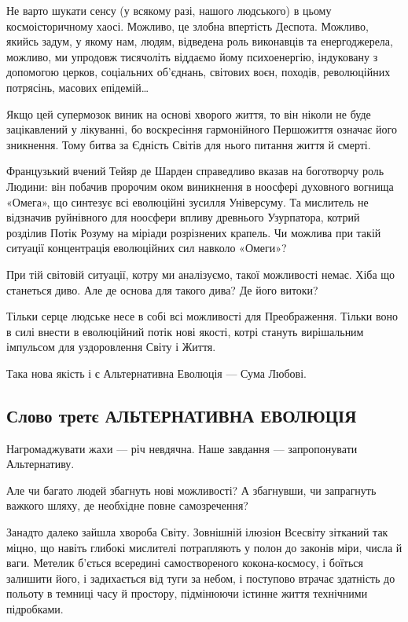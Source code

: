 Не варто шукати сенсу (у всякому разі, нашого людського) в цьому
космоісторичному хаосі. Можливо, це злобна впертість Деспота. Можливо, якийсь
задум, у якому нам, людям, відведена роль виконавців та енергоджерела, можливо,
ми упродовж тисячоліть віддаємо йому психоенергію, індуковану з допомогою
церков, соціальних об’єднань, світових воєн, походів, революційних потрясінь,
масових епідемій…

Якщо цей супермозок виник на основі хворого життя, то він ніколи не буде
зацікавлений у лікуванні, бо воскресіння гармонійного Першожиття означає його
зникнення. Тому битва за Єдність Світів для нього питання життя й смерті.

Французький вчений Тейяр де Шарден справедливо вказав на боготворчу роль
Людини: він побачив пророчим оком виникнення в ноосфері духовного вогнища
«Омега», що синтезує всі еволюційні зусилля Універсуму. Та мислитель не
відзначив руйнівного для ноосфери впливу древнього Узурпатора, котрий розділив
Потік Розуму на міріади розрізнених крапель. Чи можлива при такій ситуації
концентрація еволюційних сил навколо «Омеги»?

При тій світовій ситуації, котру ми аналізуємо, такої можливості немає. Хіба що
станеться диво. Але де основа для такого дива? Де його витоки?

Тільки серце людське несе в собі всі можливості для Преображення. Тільки воно в
силі внести в еволюційний потік нові якості, котрі стануть вирішальним
імпульсом для уздоровлення Світу і Життя.

Така нова якість і є Альтернативна Еволюція — Сума Любові.

\subsection{Слово третє АЛЬТЕРНАТИВНА ЕВОЛЮЦІЯ}

Нагромаджувати жахи — річ невдячна. Наше завдання — запропонувати Альтернативу.

Але чи багато людей збагнуть нові можливості? А збагнувши, чи запрагнуть
важкого шляху, де необхідне повне самозречення?

Занадто далеко зайшла хвороба Світу. Зовнішній ілюзіон Всесвіту зітканий так
міцно, що навіть глибокі мислителі потрапляють у полон до законів міри, числа й
ваги. Метелик б’ється всередині самоствореного кокона-космосу, і боїться
залишити його, і задихається від туги за небом, і поступово втрачає здатність
до польоту в темниці часу й простору, підмінюючи істинне життя технічними
підробками.

